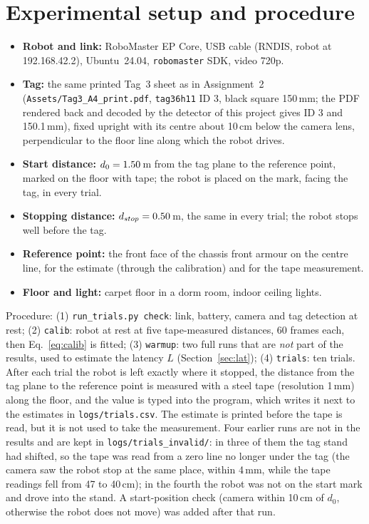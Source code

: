 \documentclass[11pt,a4paper]{article}
\begin{document}
\section{Experimental setup and procedure}
\begin{itemize}
\item \textbf{Robot and link:} RoboMaster EP Core, USB cable (RNDIS, robot at 192.168.42.2), Ubuntu~24.04, \texttt{robomaster} SDK, video 720p.
\item \textbf{Tag:} the same printed Tag~3 sheet as in Assignment~2 (\texttt{Assets/Tag3\_A4\_print.pdf}, \texttt{tag36h11} ID 3, black square 150\,mm; the PDF rendered back and decoded by the detector of this project gives ID 3 and 150.1\,mm), fixed upright with its centre about 10\,cm below the camera lens, perpendicular to the floor line along which the robot drives.
\item \textbf{Start distance:} $d_0=1.50$\,m from the tag plane to the reference point, marked on the floor with tape; the robot is placed on the mark, facing the tag, in every trial.
\item \textbf{Stopping distance:} $d_{stop}=0.50$\,m, the same in every trial; the robot stops well before the tag.
\item \textbf{Reference point:} the front face of the chassis front armour on the centre line, for the estimate (through the calibration) and for the tape measurement.
\item \textbf{Floor and light:} carpet floor in a dorm room, indoor ceiling lights.
\end{itemize}
Procedure: (1) \texttt{run\_trials.py check}: link, battery, camera and tag detection at rest; (2) \texttt{calib}: robot at rest at five tape-measured distances, 60 frames each, then Eq.~\eqref{eq:calib} is fitted; (3) \texttt{warmup}: two full runs that are \emph{not} part of the results, used to estimate the latency $L$ (Section~\ref{sec:lat}); (4) \texttt{trials}: ten trials. After each trial the robot is left exactly where it stopped, the distance from the tag plane to the reference point is measured with a steel tape (resolution 1\,mm) along the floor, and the value is typed into the program, which writes it next to the estimates in \texttt{logs/trials.csv}. The estimate is printed before the tape is read, but it is not used to take the measurement. Four earlier runs are not in the results and are kept in \texttt{logs/trials\_invalid/}: in three of them the tag stand had shifted, so the tape was read from a zero line no longer under the tag (the camera saw the robot stop at the same place, within 4\,mm, while the tape readings fell from 47 to 40\,cm); in the fourth the robot was not on the start mark and drove into the stand. A start-position check (camera within 10\,cm of $d_0$, otherwise the robot does not move) was added after that run.
\end{document}
